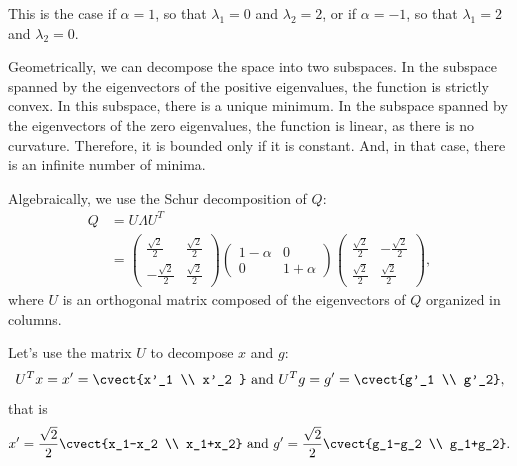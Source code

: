  This is the case if $\alpha = 1$, so that
  $\lambda_1=0$ and $\lambda_2=2$, or if $\alpha = -1$, so that
  $\lambda_1=2$ and $\lambda_2=0$.

 Geometrically, we can decompose the space into two subspaces. In the
 subspace spanned by the eigenvectors of the positive eigenvalues, the
 function is strictly convex. In this subspace, there is a unique minimum. In the subspace spanned by the
 eigenvectors of the zero eigenvalues, the function is linear, as
 there is no curvature. Therefore, it is bounded only if it is
 constant. And, in that case, there is an infinite number of minima. 

 Algebraically, we use the Schur decomposition of $Q$:
\begin{align*}
Q & = U \Lambda U^T\\
& = \begin{pmatrix}
\frac{\sqrt{2}}{2} & \frac{\sqrt{2}}{2}\\ -\frac{\sqrt{2}}{2} & \frac{\sqrt{2}}{2}
\end{pmatrix} \begin{pmatrix}
1-\alpha & 0\\ 0& 1+\alpha
\end{pmatrix} \begin{pmatrix}
\frac{\sqrt{2}}{2} & -\frac{\sqrt{2}}{2}\\ \frac{\sqrt{2}}{2} & \frac{\sqrt{2}}{2}
\end{pmatrix},
\end{align*}
where $U$ is an orthogonal matrix composed of the eigenvectors of $Q$
organized in columns.

Let's use the matrix $U$ to decompose $x$ and $g$:
\[
U^Tx = x' = \cvect{x'_1 \\ x'_2 } \text{ and } U^Tg = g' = \cvect{g'_1
\\ g'_2},
\]
that is
\[
x' = \frac{\sqrt{2}}{2}\cvect{x_1-x_2 \\ x_1+x_2}\text{ and } g' = \frac{\sqrt{2}}{2}\cvect{g_1-g_2 \\ g_1+g_2}.
\]


